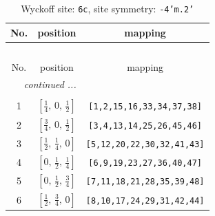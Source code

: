 \documentclass[fleqn,8pt]{jsarticle}
\begin{document}
\renewcommand{\arraystretch}{1.2}
\begin{longtable}{ccc}
\caption{Wyckoff site: {\tt 6c}, site symmetry: {\tt -4'm.2'}}
 \\
 \hline \hline
No. & position & mapping \\ \hline \endfirsthead

\multicolumn{2}{l}{\tablename\ \thetable{}} \\
 \hline \hline
No. & position & mapping \\ \hline \endhead

 \hline \hline
\multicolumn{2}{r}{\footnotesize\it continued ...} \\ \endfoot

 \hline \hline
\multicolumn{2}{r}{} \\ \endlastfoot

1 & $\left[ \frac{1}{4},\, 0,\, \frac{1}{2} \right]$ & {\tt [1,2,15,16,33,34,37,38]} \\ \hline
2 & $\left[ \frac{3}{4},\, 0,\, \frac{1}{2} \right]$ & {\tt [3,4,13,14,25,26,45,46]} \\ \hline
3 & $\left[ \frac{1}{2},\, \frac{1}{4},\, 0 \right]$ & {\tt [5,12,20,22,30,32,41,43]} \\ \hline
4 & $\left[ 0,\, \frac{1}{2},\, \frac{1}{4} \right]$ & {\tt [6,9,19,23,27,36,40,47]} \\ \hline
5 & $\left[ 0,\, \frac{1}{2},\, \frac{3}{4} \right]$ & {\tt [7,11,18,21,28,35,39,48]} \\ \hline
6 & $\left[ \frac{1}{2},\, \frac{3}{4},\, 0 \right]$ & {\tt [8,10,17,24,29,31,42,44]} \\
\end{longtable}
\renewcommand{\arraystretch}{1.2}
\end{document}
